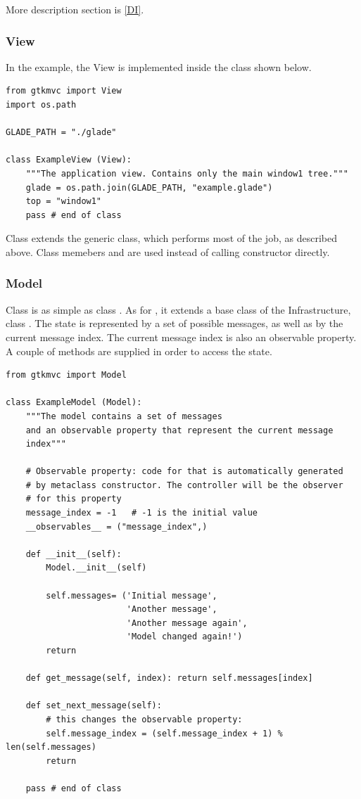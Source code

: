 More description section is \ref{DI}.


\subsubsection{View}
In the example, the View is implemented inside the class
 shown below.

{ \codesize 
\begin{verbatim}  
from gtkmvc import View
import os.path

GLADE_PATH = "./glade" 

class ExampleView (View):
    """The application view. Contains only the main window1 tree."""
    glade = os.path.join(GLADE_PATH, "example.glade")
    top = "window1"
    pass # end of class
\end{verbatim}}

Class  extends the generic 
class, which performs most of the job, as described above.
Class memebers  and  are used instead of 
calling  constructor directly. 

\subsubsection{Model}
Class  is as simple as class
.  As for , it extends a
base class of the \mvco Infrastructure, class .  The
state is represented by a set of possible messages, as well as by the
current message index. The current message index is also an
observable property. A couple of methods are supplied in order to
access the state.

{ \codesize 
\begin{verbatim} 
from gtkmvc import Model

class ExampleModel (Model):
    """The model contains a set of messages
    and an observable property that represent the current message
    index"""

    # Observable property: code for that is automatically generated
    # by metaclass constructor. The controller will be the observer
    # for this property
    message_index = -1   # -1 is the initial value
    __observables__ = ("message_index",)

    def __init__(self):
        Model.__init__(self)

        self.messages= ('Initial message',
                        'Another message', 
                        'Another message again',
                        'Model changed again!')
        return

    def get_message(self, index): return self.messages[index]

    def set_next_message(self):
        # this changes the observable property:
        self.message_index = (self.message_index + 1) % len(self.messages)
        return

    pass # end of class

\end{verbatim}
}

